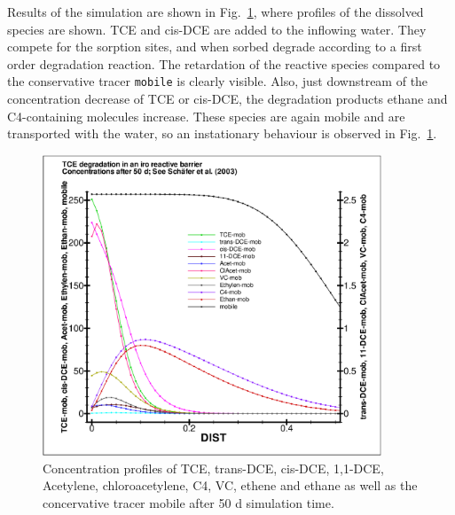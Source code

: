 Results of the simulation are shown in Fig.~\ref{profiles_TCEonIon}, where profiles of the dissolved species are shown. TCE and cis-DCE are added to the inflowing water. They compete for the sorption sites, and when sorbed degrade according to a first order degradation reaction. The retardation of the reactive species compared to the conservative tracer \texttt{mobile} is clearly visible. Also, just downstream of the concentration decrease of TCE or cis-DCE, the degradation products ethane and C4-containing molecules increase. These species are again mobile and are transported with the water, so an instationary behaviour is observed in Fig.~\ref{profiles_TCEonIon}.

\begin{figure}[htbp]
\centering
\includegraphics[width=0.9\textwidth]{PART_III/HC/1d_TCEonIon.eps}
\caption{Concentration profiles of TCE, trans-DCE, cis-DCE, 1,1-DCE, Acetylene, chloroacetylene, C4, VC, ethene and ethane as well as the concervative tracer mobile after 50 d simulation time.}
\label{profiles_TCEonIon}
\end{figure}
